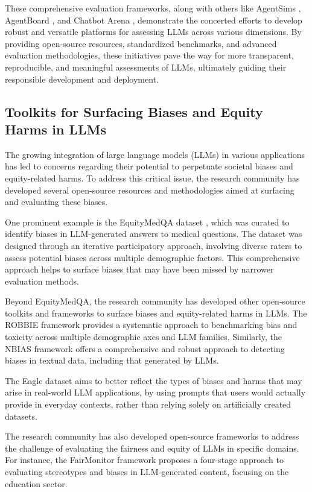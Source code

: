 \documentclass[11pt]{article}
\begin{document}
These comprehensive evaluation frameworks, along with others like AgentSims \cite{ref307}, AgentBoard \cite{ref208}, and Chatbot Arena \cite{ref308}, demonstrate the concerted efforts to develop robust and versatile platforms for assessing LLMs across various dimensions. By providing open-source resources, standardized benchmarks, and advanced evaluation methodologies, these initiatives pave the way for more transparent, reproducible, and meaningful assessments of LLMs, ultimately guiding their responsible development and deployment.

\subsection{Toolkits for Surfacing Biases and Equity Harms in LLMs}

The growing integration of large language models (LLMs) in various applications has led to concerns regarding their potential to perpetuate societal biases and equity-related harms. To address this critical issue, the research community has developed several open-source resources and methodologies aimed at surfacing and evaluating these biases.

One prominent example is the EquityMedQA dataset \cite{ref81}, which was curated to identify biases in LLM-generated answers to medical questions. The dataset was designed through an iterative participatory approach, involving diverse raters to assess potential biases across multiple demographic factors. This comprehensive approach helps to surface biases that may have been missed by narrower evaluation methods.

Beyond EquityMedQA, the research community has developed other open-source toolkits and frameworks to surface biases and equity-related harms in LLMs. The ROBBIE framework \cite{ref153} provides a systematic approach to benchmarking bias and toxicity across multiple demographic axes and LLM families. Similarly, the NBIAS framework \cite{ref309} offers a comprehensive and robust approach to detecting biases in textual data, including that generated by LLMs.

The Eagle dataset \cite{ref310} aims to better reflect the types of biases and harms that may arise in real-world LLM applications, by using prompts that users would actually provide in everyday contexts, rather than relying solely on artificially created datasets.

The research community has also developed open-source frameworks to address the challenge of evaluating the fairness and equity of LLMs in specific domains. For instance, the FairMonitor framework \cite{ref311} proposes a four-stage approach to evaluating stereotypes and biases in LLM-generated content, focusing on the education sector.
\end{document}
